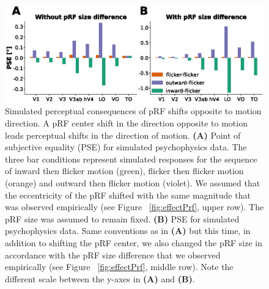 \begin{figure}[htbp!]
\centering
\includegraphics[width=\textwidth]{figures/chapter_04/fig4b.eps}
\caption{Simulated perceptual consequences of pRF shifts opposite to motion direction. A pRF center shift in the direction opposite to motion leads perceptual shifts in the direction of motion.
\textbf{(A)} Point of subjective equality (PSE) for simulated psychophysics data. The three bar conditions represent simulated responses for the sequence of inward then flicker motion (green), flicker then flicker motion (orange) and outward then flicker motion (violet). We assumed that the eccentricity of the pRF shifted with the same magnitude that was observed empirically (see Figure ~\ref{fig:effectPrf}, upper row). The pRF size was assumed to remain fixed.
\textbf{(B)} PSE for simulated psychophysics data. Same conventions as in \textbf{(A)} but this time, in addition to shifting the pRF center, we also changed the pRF size in accordance with the pRF size difference that we observed empirically (see Figure ~\ref{fig:effectPrf}, middle row). Note the different scale between the y-axes in \textbf{(A)} and \textbf{(B)}.}
\label{fig:modelOv_simShift}
\end{figure}

